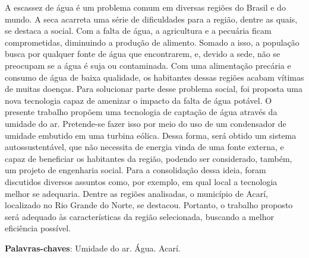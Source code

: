 \begin{resumo}
 A escassez de água é um problema comum em diversas regiões do Brasil e do mundo. A seca acarreta uma série de dificuldades
 para a região, dentre as quais, se destaca a social. Com a falta  de água, a agricultura e a pecuária ficam comprometidas,
 diminuindo a produção de alimento. Somado a isso, a população busca  por qualquer fonte de água que encontrarem, e, devido
 a sede,  não se preocupam se a água é suja ou contaminada. Com uma alimentação precária e consumo de água de baixa qualidade,
 os habitantes dessas regiões acabam vítimas de muitas doenças. Para solucionar parte desse problema social, foi proposta uma
 nova tecnologia capaz de amenizar o impacto da falta de água potável. O presente trabalho propõem uma tecnologia de captação
 de água através da umidade do ar. Pretende-se fazer isso por meio do uso de um condensador de umidade embutido em uma turbina
 eólica. Dessa forma, será obtido um sistema autossustentável, que não necessita de energia vinda de uma fonte externa, e capaz
 de beneficiar os habitantes da região, podendo ser considerado, também, um projeto de engenharia social. Para a consolidação
 dessa ideia, foram discutidos diversos assuntos como, por exemplo, em qual local a tecnologia melhor se adequaria.
 Dentre as regiões analisadas, o município de Acarí, localizado no Rio Grande do Norte, se destacou. Portanto, o trabalho
 proposto será adequado às características da região selecionada, buscando a melhor eficiência possível.

 \vspace{\onelineskip}
    
 \noindent
 \textbf{Palavras-chaves}: Umidade do ar. Água. Acarí.
\end{resumo}
